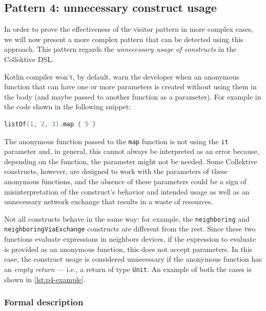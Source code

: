\documentclass[12pt,a4paper,openright,twoside]{book}
\begin{document}
\subsection{Pattern 4: unnecessary construct usage}

In order to prove the effectiveness of the visitor pattern in more complex cases,
we will now present a more complex pattern that can be detected using this
approach. This pattern regards the \emph{unnecessary usage of constructs} in the
Collektive DSL.

Kotlin compiler won't, by default, warn the developer when an anonymous function
that can have one or more parameters is created without using them in the body 
(and maybe passed to another function as a parameter). For example in the code
shown in the following snippet:

\begin{lstlisting}[language=Kotlin]
listOf(1, 2, 3).map { 5 }
\end{lstlisting}

The anonymous function passed to the \lstinline{map} function is not using the
\lstinline{it} parameter and, in general, this cannot always be interpreted as
an error because, depending on the function, the parameter might not be needed.
%
Some Collektive constructs, however, are designed to work with the parameters of
these anonymous functions, and the absence of these parameters could be a sign
of misinterpretation of the construct's behavior and intended usage as well as 
an unnecessary network exchange that results in a waste of resources.

Not all constructs behave in the same way: for example, the
\lstinline{neighboring} and \lstinline{neighboringViaExchange} constructs are
different from the rest. Since these two functions evaluate expressions in
neighbors devices, if the expression to evaluate is provided as an anonymous
function, this does not accept parameters. In this case, the construct usage is
considered unnecessary if the anonymous function has an \emph{empty return} ---
i.e., a return of type \lstinline{Unit}. 
%
An example of both the cases is shown in \cref{lst:p4-example}.



\subsubsection{Formal description}
\end{document}
